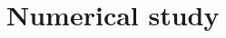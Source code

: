 \documentclass[12pt]{article} %
\DeclareMathOperator{\mytr}{tr}
\DeclareMathOperator{\myE}{E}
\newcommand{\bX}{\mathbf{X}}
\newcommand{\bfsym}[1]{\ensuremath{\boldsymbol{#1}}}
\def\bSigma {\bfsym {\Sigma}}
\def\bTheta {\bfsym {\Theta}}
\theoremstyle{definition}
\begin{document}
%






\section{Numerical study}\label{numerical}
\end{document}
